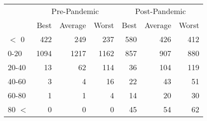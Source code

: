 
\begin{tabular}[t]{lrrrrrr}
\toprule
\multicolumn{1}{c}{ } & \multicolumn{3}{c}{Pre-Pandemic} & \multicolumn{3}{c}{Post-Pandemic} \\
\cmidrule(l{3pt}r{3pt}){2-4} \cmidrule(l{3pt}r{3pt}){5-7}
 & Best & Average & Worst & Best & Average & Worst\\
\midrule
$<$ 0 & 422 & 249 & 237 & 580 & 426 & 412\\
0-20 & 1094 & 1217 & 1162 & 857 & 907 & 880\\
20-40 & 13 & 62 & 114 & 36 & 104 & 119\\
40-60 & 3 & 4 & 16 & 22 & 43 & 51\\
60-80 & 1 & 1 & 4 & 14 & 20 & 30\\
80 $<$ & 0 & 0 & 0 & 45 & 54 & 62\\
\bottomrule
\end{tabular}
